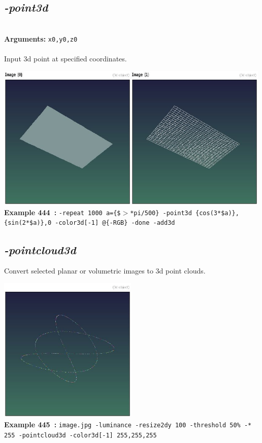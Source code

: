 \documentclass[a4paper,11pt,twoside]{book}
\begin{document}
\subsection{\emph{-point3d} }\vspace*{-0.5em}
~\\\textbf{Arguments: } 
{\small \texttt{x0,y0,z0}}\\~\\
Input 3d point at specified coordinates.
\begin{center}\includegraphics[keepaspectratio=true,height=7cm,width=\textwidth]{img/gmic_def444.jpg}\\
{\footnotesize \textbf{Example 444~:} \texttt{-repeat 1000 a=\{\$$>$*pi/500\} -point3d \{cos(3*\$a)\},\{sin(2*\$a)\},0 -color3d[-1] @\{-RGB\} -done -add3d}}
\end{center}

\subsection{\emph{-pointcloud3d} }\vspace*{-0.5em}
Convert selected planar or volumetric images to 3d point clouds.
\begin{center}\includegraphics[keepaspectratio=true,height=7cm,width=\textwidth]{img/gmic_def445.jpg}\\
{\footnotesize \textbf{Example 445~:} \texttt{image.jpg -luminance -resize2dy 100 -threshold 50\% -* 255 -pointcloud3d -color3d[-1] 255,255,255}}
\end{center}
\end{document}
